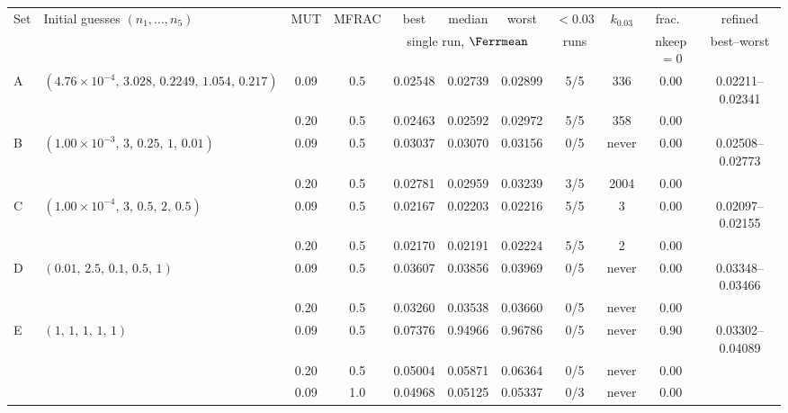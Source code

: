 \begin{tabular}{@{}l l c c c c c c c c c@{}}
\toprule
Set & Initial guesses $(n_1,\dots,n_5)$ & MUT & MFRAC & best & median & worst & $<0.03$ & $k_{0.03}$ & frac.\ & refined\\
& & & & \multicolumn{3}{c}{single run, $\Ferrmean$} & runs & & nkeep$=0$ & best--worst\\
\midrule
A & $(4.76\times10^{-4},\,3.028,\,0.2249,\,1.054,\,0.217)$ & 0.09 & 0.5 & 0.02548 & 0.02739 & 0.02899 & 5/5 & 336 & 0.00 & 0.02211--0.02341\\
 &  & 0.20 & 0.5 & 0.02463 & 0.02592 & 0.02972 & 5/5 & 358 & 0.00 & \\
\midrule
B & $(1.00\times10^{-3},\,3,\,0.25,\,1,\,0.01)$ & 0.09 & 0.5 & 0.03037 & 0.03070 & 0.03156 & \color{bad}0/5 & never & 0.00 & 0.02508--0.02773\\
 &  & 0.20 & 0.5 & 0.02781 & 0.02959 & 0.03239 & \color{bad}3/5 & 2004 & 0.00 & \\
\midrule
C & $(1.00\times10^{-4},\,3,\,0.5,\,2,\,0.5)$ & 0.09 & 0.5 & 0.02167 & 0.02203 & 0.02216 & 5/5 & 3 & 0.00 & 0.02097--0.02155\\
 &  & 0.20 & 0.5 & 0.02170 & 0.02191 & 0.02224 & 5/5 & 2 & 0.00 & \\
\midrule
D & $(0.01,\,2.5,\,0.1,\,0.5,\,1)$ & 0.09 & 0.5 & 0.03607 & 0.03856 & 0.03969 & \color{bad}0/5 & never & 0.00 & 0.03348--0.03466\\
 &  & 0.20 & 0.5 & 0.03260 & 0.03538 & 0.03660 & \color{bad}0/5 & never & 0.00 & \\
\midrule
E & $(1,\,1,\,1,\,1,\,1)$ & 0.09 & 0.5 & 0.07376 & 0.94966 & 0.96786 & \color{bad}0/5 & never & 0.90 & 0.03302--0.04089\\
 &  & 0.20 & 0.5 & 0.05004 & 0.05871 & 0.06364 & \color{bad}0/5 & never & 0.00 & \\
 &  & 0.09 & 1.0 & 0.04968 & 0.05125 & 0.05337 & \color{bad}0/3 & never & 0.00 & \\
\bottomrule
\end{tabular}
